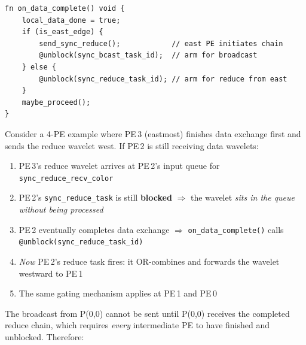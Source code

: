 \documentclass[11pt,letterpaper]{article}
\begin{document}
\begin{lstlisting}[language=CSL, numbers=none, caption={Unblock only when data exchange is complete}]
fn on_data_complete() void {
    local_data_done = true;
    if (is_east_edge) {
        send_sync_reduce();            // east PE initiates chain
        @unblock(sync_bcast_task_id);  // arm for broadcast
    } else {
        @unblock(sync_reduce_task_id); // arm for reduce from east
    }
    maybe_proceed();
}
\end{lstlisting}

Consider a 4-PE example where PE\,3 (eastmost) finishes data exchange first and sends the reduce wavelet west. If PE\,2 is still receiving data wavelets:

\begin{enumerate}[nosep]
  \item PE\,3's reduce wavelet arrives at PE\,2's input queue for \texttt{sync\_reduce\_recv\_color}
  \item PE\,2's \texttt{sync\_reduce\_task} is still \textbf{blocked} $\Rightarrow$ the wavelet \emph{sits in the queue without being processed}
  \item PE\,2 eventually completes data exchange $\Rightarrow$ \texttt{on\_data\_complete()} calls \texttt{@unblock(sync\_reduce\_task\_id)}
  \item \emph{Now} PE\,2's reduce task fires: it OR-combines and forwards the wavelet westward to PE\,1
  \item The same gating mechanism applies at PE\,1 and PE\,0
\end{enumerate}

The broadcast from P(0,0) cannot be sent until P(0,0) receives the completed reduce chain, which requires \emph{every} intermediate PE to have finished and unblocked. Therefore:
\end{document}
